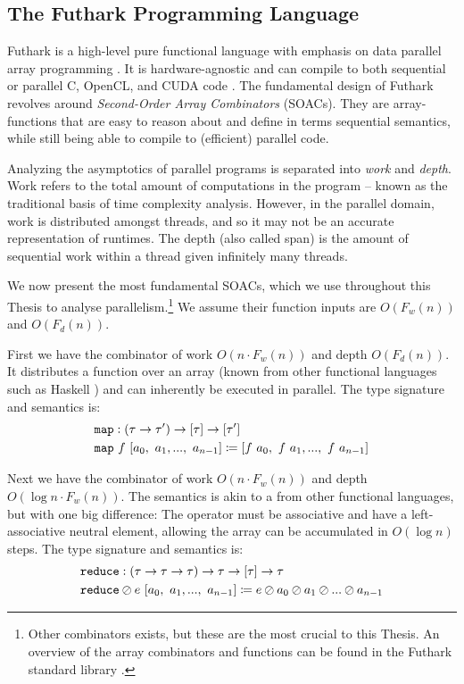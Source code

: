 \subsection{The Futhark Programming Language}
\label{subsec:futhark}

Futhark is a high-level pure functional language with emphasis on data parallel
array programming
\cite{ParallelProgrammingInFuthark,Henriksen:2017:FPF:3062341.3062354}. It is
hardware-agnostic and can compile to both sequential or parallel C, OpenCL, and
CUDA code \cite{futguide2}. The fundamental design of Futhark revolves around
\textit{Second-Order Array Combinators} (SOACs). They are array-functions that
are easy to reason about and define in terms sequential semantics, while still
being able to compile to (efficient) parallel code.

Analyzing the asymptotics of parallel programs is separated into \textit{work}
and \textit{depth}. Work refers to the total amount of computations in the
program -- known as the traditional basis of time complexity analysis. However,
in the parallel domain, work is distributed amongst threads, and so it may not
be an accurate representation of runtimes. The depth (also called span) is the
amount of sequential work within a thread given infinitely many threads.

We now present the most fundamental SOACs, which we use throughout this Thesis
to analyse parallelism.\footnote{Other combinators exists, but these are the
  most crucial to this Thesis. An overview of the array combinators and
  functions can be found in the Futhark standard library \cite{futprelude}.} We
assume their function inputs are $O(F_{w}(n))$ and $O(F_d(n))$.

First we have the combinator  of work $O(n\cdot F_w(n))$ and depth
$O(F_d(n))$. It distributes a function over an array (known from other
functional languages such as Haskell \cite{marlow2010haskell}) and can
inherently be executed in parallel. The type signature and semantics is:
\begin{align}
  &\mathtt{map}:(\tau \to \tau') \to \mathtt{[}\tau\mathtt{]} \to \mathtt{[}\tau'\mathtt{]}\\
  &\mathtt{map}~f~[a_0,~a_1,...,~a_{n-1}] \coloneq [f~a_0,~f~a_1,...,~f~a_{n-1}]
\end{align}

Next we have the combinator  of work $O(n\cdot F_w(n))$ and depth
$O(\log n \cdot F_w(n))$.  The semantics is akin to a  from other
functional languages, but with one big difference: The operator must be
associative and have a left-associative neutral element, allowing the array can
be accumulated in $O(\log n)$ steps. The type signature and semantics is:
\begin{align}
  &\mathtt{reduce}:(\tau \to \tau \to \tau) \to \tau \to \mathtt{[}\tau\mathtt{]} \to \tau\\
  & \mathtt{reduce} \oslash e~[a_0,~a_1,...,~a_{n-1}] \coloneq e \oslash a_0 \oslash a_1 \oslash ...\oslash a_{n-1}
\end{align}

